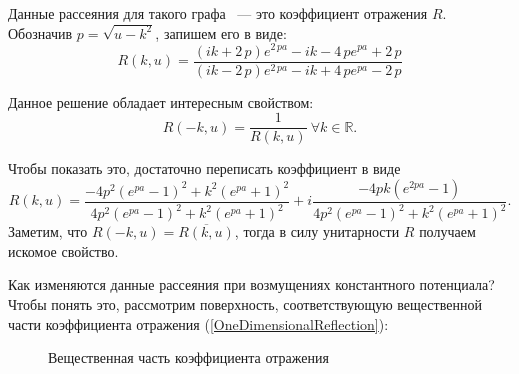 \documentclass[a4 paper, 12 pt]{extarticle}
\begin{document}
   Данные рассеяния для такого графа ~--- это коэффициент отражения $R$. Обозначив $p=\sqrt{u-k^2}$, запишем его в виде:
   \begin{equation}
   \label{OneDimensionalReflection}
   R\left(k,u\right) = {\frac { \left( ik+2\,p \right) {e}^{2\,pa}-ik-4\,p{e}^{pa}+2\,p}{ \left( ik-2\,p \right) {e}^{2\,pa}-ik+4\,p{e}^{pa}-2\,p}}
   \end{equation}
   
   Данное решение обладает интересным свойством: \[R\left(-k,u\right) = \frac{1}{R\left(k,u\right)} \ \forall k \in \mathbb{R}.\]
   
   Чтобы показать это, достаточно переписать коэффициент в виде
   \[ R\left(k,u\right) =
   \frac{-4p^2 \left(e^{pa}-1\right)^2 + k^2 \left(e^{pa}+1\right)^2}{4p^2 \left(e^{pa}-1\right)^2 + k^2 \left(e^{pa}+1\right)^2} + i \frac{-4pk\left(e^{2pa}-1\right)}{4p^2 \left(e^{pa}-1\right)^2 + k^2 \left(e^{pa}+1\right)^2}.\]
   Заметим, что $R\left(-k,u\right) = \overline{R\left(k,u\right)}$, тогда в силу унитарности $R$ получаем искомое свойство.  
   
   Как изменяются данные рассеяния при возмущениях константного потенциала?
   Чтобы понять это, рассмотрим поверхность, соответствующую вещественной части коэффициента отражения (\ref{OneDimensionalReflection}):
   
   \begin{figure}[!htb]
   	\begin{minipage}[h]{0.49\linewidth}
   	\end{minipage}
      	\begin{minipage}[h]{0.49\linewidth}
   \end{minipage}
   \caption{Вещественная часть коэффициента отражения}
   \label{fig:real}
   \end{figure}
   
\end{document}
